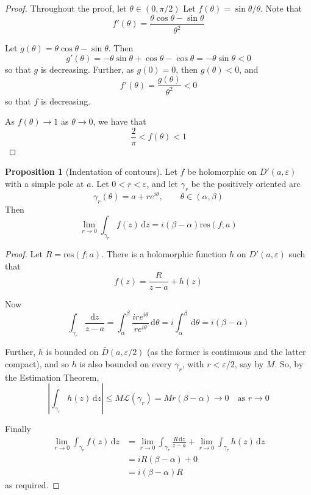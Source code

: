 \documentclass[10pt,fleqn]{article}
\newcommand{\diff}{\,\mathrm{d}}
\newcommand{\eps}{\varepsilon}
\newcommand{\res}{\mathrm{res}}
\theoremstyle{definition} \newtheorem{defn}{Definition}[section]
\theoremstyle{plain}      \newtheorem{thm}[defn]{Theorem}
\theoremstyle{definition} \newtheorem{prop}[defn]{Proposition}
\theoremstyle{plain}      \newtheorem{lem}[defn]{Lemma}
\theoremstyle{definition} \newtheorem{cor}[defn]{Corollary}
\theoremstyle{definition} \newtheorem{ex}[defn]{Example}
\theoremstyle{definition} \newtheorem{rem}[defn]{Remark}
\begin{document}
\begin{proof}
    Throughout the proof, let $\theta\in(0,\pi/2)$
    Let $f(\theta)=\sin\theta/\theta$.
    Note that
    \[
        f'(\theta)=
        \frac{\theta\cos\theta-\sin\theta}{\theta^2}
    \]

    Let $g(\theta)=\theta\cos\theta-\sin\theta$.
    Then
    \[
        g'(\theta)=
        -\theta\sin\theta+\cos\theta-\cos\theta=
        -\theta\sin\theta<
        0
    \]
    so that $g$ is decreasing.
    Further, as $g(0)=0$, then $g(\theta)<0$, and
    \[
        f'(\theta)=
        \frac{g(\theta)}{\theta^2}<
        0
    \]
    so that $f$ is decreasing.

    As $f(\theta)\to1$ as $\theta\to0$, we have that
    \[
        \frac{2}{\pi}<
        f(\theta)<
        1
    \]
\end{proof}

\begin{prop}[Indentation of contours]
    Let $f$ be holomorphic on $D'(a,\eps)$ with a simple pole at $a$.
    Let $0<r<\eps$, and let $\gamma_r$ be the positively oriented arc
    \[
        \gamma_r(\theta)=
        a+re^{i\theta},\qquad
        \theta\in(\alpha,\beta)
    \]
    Then
    \[
        \lim_{r\to0}\int_{\gamma_r} f(z)\diff z=
        i(\beta-\alpha)\res(f;a)
    \]
\end{prop}

\begin{proof}
    Let $R=\res(f;a)$.
    There is a holomorphic function $h$ on $D'(a,\eps)$ such that
    \[
        f(z)=
        \frac{R}{z-a}+h(z)
    \]

    Now
    \[
        \int_{\gamma_r}\frac{\mathrm{d}z}{z-a}=
        \int_{\alpha}^{\beta}\frac{ire^{i\theta}}{re^{i\theta}}\diff\theta=
        i\int_{\alpha}^{\beta}\diff\theta=
        i(\beta-\alpha)
    \]

    Further, $h$ is bounded on $\bar{D}(a,\eps/2)$ (as the former is continuous and the latter compact), and so $h$ is also bounded on every $\gamma_r$, with $r<\eps/2$, say by $M$.
    So, by the Estimation Theorem,
    \[
        \left|\int_{\gamma_r} h(z)\diff z\right|\leq
        M\mathcal{L}(\gamma_r)=
        Mr(\beta-\alpha)\to0\quad\text{as }r\to0
    \]

    Finally
    \begin{align*}
        \lim_{r\to0}\int_{\gamma_r} f(z)\diff z
        &=
        \lim_{r\to0}\int_{\gamma_r}\frac{R\diff z}{z-a} + \lim_{r\to0}\int_{\gamma_r} h(z)\diff z\\
        &=
        iR(\beta-\alpha)+0\\
        &=
        i(\beta-\alpha)R
    \end{align*}
    as required.
\end{proof}
\end{document}
